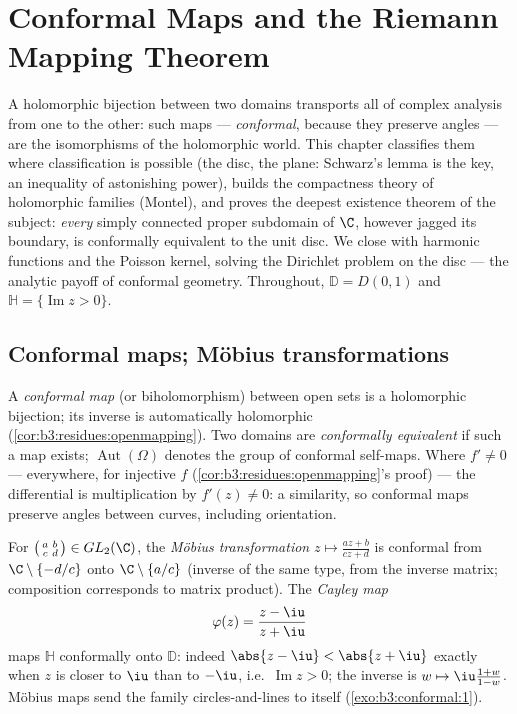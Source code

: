 \chapter{Conformal Maps and the Riemann Mapping Theorem}
\label{ch:b3:conformal}

A holomorphic bijection between two domains transports all of
complex analysis from one to the other: such maps ---
\emph{conformal}, because they preserve angles --- are the
isomorphisms of the holomorphic world. This chapter classifies
them where classification is possible (the disc, the plane:
Schwarz's lemma is the key, an inequality of astonishing
power), builds the compactness theory of holomorphic families
(Montel), and proves the deepest existence theorem of the
subject: \emph{every} simply connected proper subdomain of
$\C$, however jagged its boundary, is conformally equivalent
to the unit disc. We close with harmonic functions and the
Poisson kernel, solving the Dirichlet problem on the disc ---
the analytic payoff of conformal geometry. Throughout,
$\mathbb D = D(0,1)$ and $\mathbb H = \{\operatorname{Im}z >
0\}$.

\section{Conformal maps; M\"obius transformations}

\begin{definition}\label{def:b3:conformal:conformal}
A \emph{conformal map} (or
biholomorphism) between open sets is a holomorphic bijection;
its inverse is automatically holomorphic
(\cref{cor:b3:residues:openmapping}). Two domains are
\emph{conformally equivalent} if such a map exists;
$\operatorname{Aut}(\Omega)$ denotes the group of conformal
self-maps. Where $f' \neq 0$ --- everywhere, for injective $f$
(\cref{cor:b3:residues:openmapping}'s proof) --- the
differential is multiplication by $f'(z) \neq 0$: a
similarity, so conformal maps preserve angles between curves,
including orientation.
\end{definition}

\begin{example}
\label{ex:b3:conformal:mobius}
For $\bigl(\begin{smallmatrix}a & b\\ c &
d\end{smallmatrix}\bigr) \in GL_2(\C)$, the \emph{M\"obius
transformation} $z \mapsto
\frac{az + b}{cz + d}$ is conformal from
$\C\setminus\{-d/c\}$ onto $\C\setminus\{a/c\}$ (inverse of
the same type, from the inverse matrix; composition
corresponds to matrix product). The \emph{Cayley
map}
\[
\varphi(z) = \frac{z - \iu}{z + \iu}
\]
maps $\mathbb H$ conformally onto $\mathbb D$: indeed $\abs{z
- \iu} < \abs{z + \iu}$ exactly when $z$ is closer to $\iu$
than to $-\iu$, i.e.\ $\operatorname{Im}z > 0$; the inverse is
$w \mapsto \iu\frac{1 + w}{1 - w}$. M\"obius maps send the
family circles-and-lines to itself (\cref{exo:b3:conformal:1}).
\end{example}

